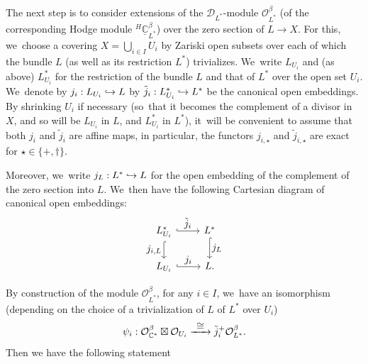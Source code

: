 \documentclass[JEP,XML,SOM,Unicode,published]{cedram}
\let\mathds\mathbb
\let\ts\textstyle
\newcommand\hto{\mathrel{\lhook\joinrel\to}}
\newcommand{\To}[1]{\mathchoice{\xrightarrow{\textstyle\kern4pt#1\kern3pt}}{\xrightarrow{\,#1\,}}{}{}}
\newcommand{\dC}{{\mathds C}}\let\C\dC
\newcommand{\cD}{\mathscr{D}}
\newcommand{\cO}{\mathcal{O}}\let\O\cO
\begin{document}
The next step is to consider extensions of the $\cD_{L^*}$\nobreakdash-mod\-ule $\cO^\beta_{L^*}$ (\resp of the corresponding Hodge module $^{H\!}\underline{\dC}^\beta_{L^*}$) over the zero section of $L\to X$. For this, we~choose a covering
$X=\bigcup_{i\in I} U_i$ by Zariski open subsets over each of which the bundle $L$ (as well as its restriction $L^*$) trivializes. We~write $L_{U_i}$ and (as above) $L^*_{U_i}$ for the restriction of the bundle $L$ and that of $L^*$ over the open set $U_i$. We~denote by $j_i:L_{U_i}\hto L$ \resp by
$\tilde{j}_i:L^*_{U_i}\hto L^*$ be the canonical open embeddings.
By shrinking $U_i$ if necessary (so~that it becomes the complement of a divisor in $X$, and so will be $L_{U_i}$ in $L$, and $L^*_{U_i}$ in $L^*$), it~will be convenient to assume that both $j_i$ and $\tilde{j}_i$ are affine maps, in particular, the functors $j_{i,\star}$ and $\tilde{j}_{i,\star}$ are exact for $\star\in\{+,\dag\}$.

Moreover, we~write $j_L:L^*\hto L$ for the open embedding of the complement of the zero section into $L$. We~then have the following Cartesian diagram of canonical open embeddings:
\begin{equation}\label{diag:ExtObetaOpenSubs}
\begin{tikzcd}
L^*_{U_i} \ar[hook]{r}{\ts\tilde{j}_i} \arrow[hook, d, "\ts \ts j_{i,L}"']
& L^* \ar[hook]{d}{\ts j_L} \\
L_{U_i} \ar[hook]{r}{\ts j_i} & L.
\end{tikzcd}
\end{equation}

By construction of the module $\cO^\beta_{L^*}$, for any $i\in I$, we~have an isomorphism
(depending on the choice of a trivialization of $L$ \resp of $L^*$ over $U_i$)
\[
\psi_i: \cO^\beta_{\dC^*}\boxtimes\cO_{U_i} \To{\cong} \tilde{j}_i^+ \cO_{L^*}^\beta.
\]
Then we have the following statement

\skpt
\end{document}
